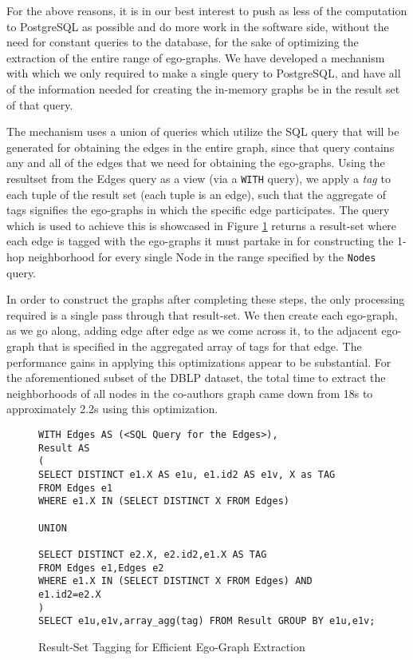 \documentclass[11pt,letterpaper]{article}
\begin{document}
For the above reasons, it is in our best interest to push as less of the computation to PostgreSQL as possible and do more work in the software side, without the need for constant queries to the database, for the sake of optimizing the extraction of the entire range of ego-graphs. We have developed a mechanism with which we only required to make a single query to PostgreSQL, and have all of the information needed for creating the in-memory graphs be in the result set of that query.

The mechanism uses a union of queries which utilize the SQL query that will be generated for obtaining the edges in the entire graph, since that query contains any and all of the edges that we need for obtaining the ego-graphs. Using the resultset from the Edges query as a view (via a \texttt{WITH} query), we apply a \textit{tag} to each tuple of the result set (each tuple is an edge), such that the aggregate of tags signifies the ego-graphs in which the specific edge participates. The query which is used to achieve this is showcased in Figure \ref{fig:tagging} returns a result-set where each edge is tagged with the ego-graphs it must partake in for constructing the 1-hop neighborhood for every single Node in the range specified by the \texttt{Nodes} query.

In order to construct the graphs after completing these steps, the only processing required is a single pass through that result-set. We then create each ego-graph, as we go along, adding edge after edge as we come across it, to the adjacent ego-graph that is specified in the aggregated array of tags for that edge. The performance gains in applying this optimizations appear to be substantial. For the aforementioned subset of the DBLP dataset, the total time to extract the neighborhoods of all nodes in the co-authors graph came down from 18s to approximately 2.2s using this optimization.

\begin{figure}[t]
\scriptsize
\begin{lstlisting}[breaklines,basicstyle=\ttfamily]
WITH Edges AS (<SQL Query for the Edges>),
Result AS
(
SELECT DISTINCT e1.X AS e1u, e1.id2 AS e1v, X as TAG
FROM Edges e1
WHERE e1.X IN (SELECT DISTINCT X FROM Edges)

UNION

SELECT DISTINCT e2.X, e2.id2,e1.X AS TAG
FROM Edges e1,Edges e2
WHERE e1.X IN (SELECT DISTINCT X FROM Edges) AND e1.id2=e2.X
)
SELECT e1u,e1v,array_agg(tag) FROM Result GROUP BY e1u,e1v;
\end{lstlisting}
\vspace{-10pt}
\caption{Result-Set Tagging for Efficient Ego-Graph Extraction}
\vspace{-10pt}
\label{fig:tagging}
\end{figure}
\end{document}
